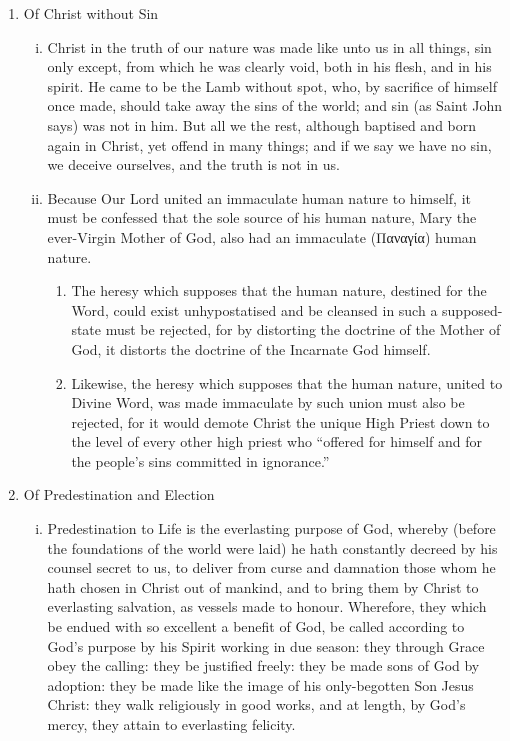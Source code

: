\begin{enumerate}
\begin{enumerate}[i.]
	\end{enumerate}
	\item Of Christ without Sin
	\begin{enumerate}[i.]
		\item Christ in the truth of our nature was made like unto us in all things, sin only except, from which he was clearly void, both in his flesh, and in his spirit. He came to be the Lamb without spot, who, by sacrifice of himself once made, should take away the sins of the world; and sin (as Saint John says) was not in him. But all we the rest, although baptised and born again in Christ, yet offend in many things; and if we say we have no sin, we deceive ourselves, and the truth is not in us.
		\item Because Our Lord united an immaculate human nature to himself, it must be confessed that the sole source of his human nature, Mary the ever-Virgin Mother of God, also had an immaculate (Παναγία) human nature.
			\begin{enumerate}
				\item The heresy which supposes that the human nature, destined for the Word, could exist unhypostatised and be cleansed in such a supposed-state must be rejected, for by distorting the doctrine of the Mother of God, it distorts the doctrine of the Incarnate God himself.
				\item Likewise, the heresy which supposes that the human nature, united to Divine Word, was made immaculate by such union must also be rejected, for it would demote Christ the unique High Priest down to the level of every other high priest who ``offered for himself and for the people's sins committed in ignorance.''
			\end{enumerate}
	\end{enumerate}
	\item Of Predestination and Election
	\begin{enumerate}[i.]
		\item Predestination to Life is the everlasting purpose of God, whereby (before the foundations of the world were laid) he hath constantly decreed by his counsel secret to us, to deliver from curse and damnation those whom he hath chosen in Christ out of mankind, and to bring them by Christ to everlasting salvation, as vessels made to honour. Wherefore, they which be endued with so excellent a benefit of God, be called according to God's purpose by his Spirit working in due season: they through Grace obey the calling: they be justified freely: they be made sons of God by adoption: they be made like the image of his only-begotten Son Jesus Christ: they walk religiously in good works, and at length, by God's mercy, they attain to everlasting felicity.

\end{enumerate}
\end{enumerate}

